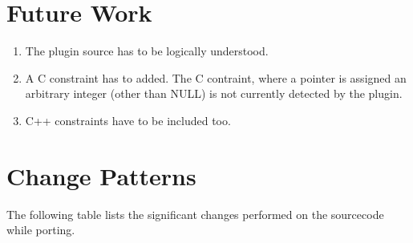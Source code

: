 \section{Future Work}\label{sec:future-work}
\begin{enumerate}
    \item The plugin source has to be logically understood.
    \item A C constraint has to added. The C contraint, where a pointer is assigned an arbitrary integer (other than NULL) is not currently detected by the plugin.
    \item C++ constraints have to be included too.
\end{enumerate}

\section{Change Patterns}\label{sec:change-patterns}

The following table lists the significant changes performed on the sourcecode while porting.





